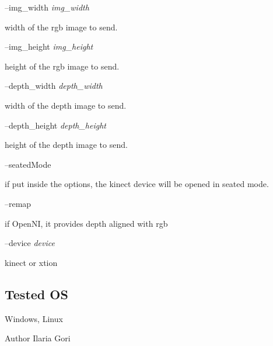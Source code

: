 --img\+\_\+width {\itshape img\+\_\+width} 
\begin{DoxyItemize}
\item width of the rgb image to send.
\end{DoxyItemize}

--img\+\_\+height {\itshape img\+\_\+height} 
\begin{DoxyItemize}
\item height of the rgb image to send.
\end{DoxyItemize}

--depth\+\_\+width {\itshape depth\+\_\+width} 
\begin{DoxyItemize}
\item width of the depth image to send.
\end{DoxyItemize}

--depth\+\_\+height {\itshape depth\+\_\+height} 
\begin{DoxyItemize}
\item height of the depth image to send.
\end{DoxyItemize}

--seated\+Mode
\begin{DoxyItemize}
\item if put inside the options, the kinect device will be opened in seated mode.
\end{DoxyItemize}

--remap
\begin{DoxyItemize}
\item if Open\+NI, it provides depth aligned with rgb
\end{DoxyItemize}

--device {\itshape device} 
\begin{DoxyItemize}
\item kinect or xtion
\end{DoxyItemize}\hypertarget{group__kinectServer_tested_os_sec}{}\subsection{Tested OS}\label{group__kinectServer_tested_os_sec}
Windows, Linux

\begin{DoxyAuthor}{Author}
Ilaria Gori 
\end{DoxyAuthor}
